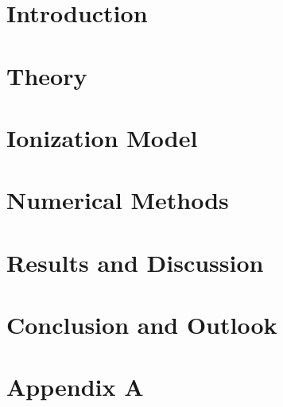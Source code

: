 \documentclass[12pt]{report}
\begin{document}

\newpage


\thispagestyle{empty}
\mbox{}
\newpage



\newpage

\thispagestyle{empty}
\mbox{}
\newpage


\begin{abstract}
    
\end{abstract}


\tableofcontents
\newpage


\listoffigures
\newpage


\chapter{Introduction}

\newpage


\chapter{Theory}

\newpage


\chapter{Ionization Model}

\newpage


\chapter{Numerical Methods}

\newpage


\chapter{Results and Discussion}

\newpage


\chapter{Conclusion and Outlook}

\newpage


\appendix
\chapter{Appendix A}

\newpage
\end{document}
